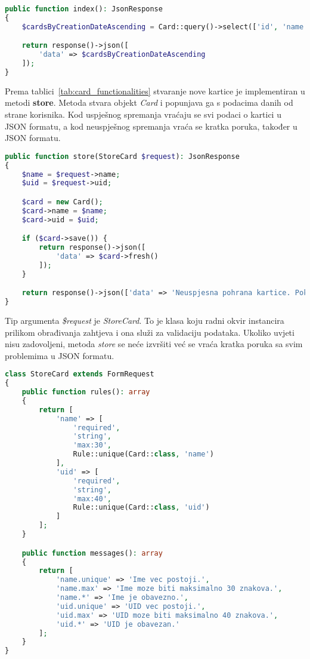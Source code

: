\begin{lstlisting}[language=PHP]
public function index(): JsonResponse
{
    $cardsByCreationDateAscending = Card::query()->select(['id', 'name', 'uid'])->orderBy('created_at')->get();

    return response()->json([
        'data' => $cardsByCreationDateAscending
    ]);
}
\end{lstlisting}

Prema tablici~\ref{tab:card_functionalities} stvaranje nove kartice je implementiran u metodi \textbf{store}.
Metoda stvara objekt \textit{Card} i popunjava ga s podacima danih od strane korisnika.
Kod uspješnog spremanja vraćaju se svi podaci o kartici u JSON formatu, a kod neuspješnog spremanja vraća se kratka poruka,
također u JSON formatu.

\begin{lstlisting}[language=PHP]
public function store(StoreCard $request): JsonResponse
{
    $name = $request->name;
    $uid = $request->uid;

    $card = new Card();
    $card->name = $name;
    $card->uid = $uid;

    if ($card->save()) {
        return response()->json([
            'data' => $card->fresh()
        ]);
    }

    return response()->json(['data' => 'Neuspjesna pohrana kartice. Pokusajte ponovo!']);
}
\end{lstlisting}

Tip argumenta \textit{\$request} je \textit{StoreCard}.
To je klasa koju radni okvir instancira prilikom obrađivanja zahtjeva i ona služi za validaciju podataka.
Ukoliko uvjeti nisu zadovoljeni, metoda \textit{store} se neće izvršiti već se vraća kratka poruka sa svim problemima u
JSON formatu.

\begin{lstlisting}[language=PHP]
class StoreCard extends FormRequest
{
    public function rules(): array
    {
        return [
            'name' => [
                'required',
                'string',
                'max:30',
                Rule::unique(Card::class, 'name')
            ],
            'uid' => [
                'required',
                'string',
                'max:40',
                Rule::unique(Card::class, 'uid')
            ]
        ];
    }

    public function messages(): array
    {
        return [
            'name.unique' => 'Ime vec postoji.',
            'name.max' => 'Ime moze biti maksimalno 30 znakova.',
            'name.*' => 'Ime je obavezno.',
            'uid.unique' => 'UID vec postoji.',
            'uid.max' => 'UID moze biti maksimalno 40 znakova.',
            'uid.*' => 'UID je obavezan.'
        ];
    }
}
\end{lstlisting}

